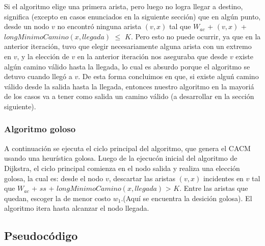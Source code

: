 \vspace{2mm}

Si el algoritmo elige una primera arista, pero luego no logra llegar a destino, significa (excepto en casos enunciados en la siguiente secci\'on) que en alg\'un punto, desde un nodo $v$ no encontr\'o ninguna arista $(v,x)$ tal que $W_{ac}$ + $(v,x)$ + $longMinimoCamino(x, llegada)$ $\leq$ $K$. Pero esto no puede ocurrir, ya que en la anterior iteraci\'on, tuvo que elegir necesariamente alguna arista con un extremo en $v$, y la elecci\'on de $v$ en la anterior iteraci\'on nos aseguraba que desde $v$ existe alg\'un camino v\'alido hasta la llegada, lo cual es absurdo porque el algoritmo se detuvo cuando lleg\'o a $v$. De esta forma concluimos en que, si existe algu\'n camino v\'alido desde la salida hasta la llegada, entonces nuestro algoritmo en la mayori\'a de los casos va a tener como salida un camino v\'alido (a desarrollar en la secci\'on siguiente).

\subsubsection{Algoritmo goloso}

A continuaci\'on se ejecuta el ciclo principal del algoritmo, que genera el CACM usando una heur\'istica golosa. Luego de la ejecuc\'on inicial del algoritmo de Dijkstra, el ciclo principal comienza en el nodo salida y realiza una elecci\'on golosa, la cual es: desde el nodo $v$, descartar las aristas $(v,x)$ incidentes en $v$ tal que $W_{ac}$ + $ss$ + $longMinimoCamino(x,llegada)$ > $K$. Entre las aristas que quedan, escoger la de menor costo $w_1$.(Aqu\'i se encuentra la desici\'on golosa). El algoritmo itera hasta alcanzar el nodo llegada.

\subsection{Pseudoc\'odigo}

